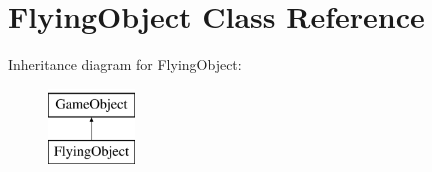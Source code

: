 \hypertarget{class_flying_object}{}\section{Flying\+Object Class Reference}
\label{class_flying_object}
Inheritance diagram for Flying\+Object\+:\begin{figure}[H]
\begin{center}
\leavevmode
\includegraphics[height=2.000000cm]{class_flying_object}
\end{center}
\end{figure}
